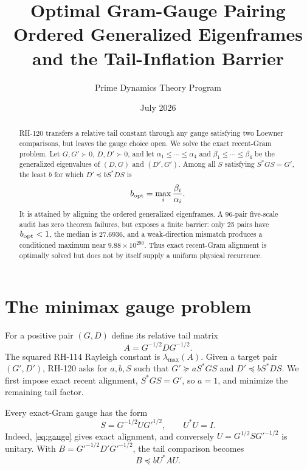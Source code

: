 \documentclass[12pt]{article}
\title{Optimal Gram-Gauge Pairing\\\large Ordered Generalized Eigenframes and the Tail-Inflation Barrier}
\author{Prime Dynamics Theory Program}
\date{July 2026}
\begin{document}
\maketitle

\begin{abstract}
RH-120 transfers a relative tail constant through any gauge satisfying two
Loewner comparisons, but leaves the gauge choice open.  We solve the exact
recent-Gram problem.  Let $G,G'\succ0$, $D,D'\succ0$, and let
$\alpha_1\leq\cdots\leq\alpha_4$ and
$\beta_1\leq\cdots\leq\beta_4$ be the generalized eigenvalues of $(D,G)$
and $(D',G')$.  Among all $S$ satisfying $S^*GS=G'$, the least $b$ for which
$D'\preceq bS^*DS$ is
\[
 b_{\rm opt}=\max_i\frac{\beta_i}{\alpha_i}.
\]
It is attained by aligning the ordered generalized eigenframes.  A
96-pair five-scale audit has zero theorem failures, but exposes a finite
barrier: only 25 pairs have $b_{\rm opt}<1$, the median is $27.6936$, and a
weak-direction mismatch produces a conditioned maximum near
$9.88\times10^{290}$.  Thus exact recent-Gram alignment is optimally solved
but does not by itself supply a uniform physical recurrence.
\end{abstract}

\section{The minimax gauge problem}
For a positive pair $(G,D)$ define its relative tail matrix
\[
 A=G^{-1/2}DG^{-1/2}.
\]
The squared RH-114 Rayleigh constant is $\lambda_{\max}(A)$.  Given a target
pair $(G',D')$, RH-120 asks for $a,b,S$ such that
$G'\succeq aS^*GS$ and $D'\preceq bS^*DS$.  We first impose exact recent
alignment, $S^*GS=G'$, so $a=1$, and minimize the remaining tail factor.

Every exact-Gram gauge has the form
\begin{equation}\label{eq:gauge}
 S=G^{-1/2}UG'^{1/2},\qquad U^*U=I.
\end{equation}
Indeed, \eqref{eq:gauge} gives exact alignment, and conversely
$U=G^{1/2}SG'^{-1/2}$ is unitary.  With
$B=G'^{-1/2}D'G'^{-1/2}$, the tail comparison becomes
\begin{equation}\label{eq:relative}
 B\preceq bU^*AU.
\end{equation}
\end{document}
